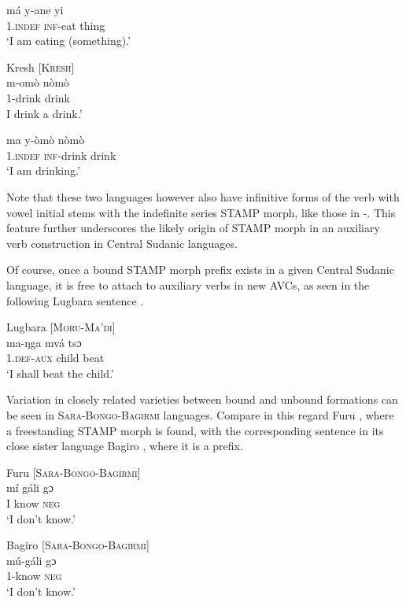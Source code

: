 \documentclass[output=paper]{langsci/langscibook}
\begin{document}
\ex \label{ex:anderson:55b}
\gll má    y-ane    yi\\
 1.\textsc{indef}  \textsc{inf}-eat    thing\\
\glt `I am eating (something).'
\z
\z

\ea\label{ex:anderson:56}
Kresh \citep[75]{TuckerBryan1966}     [\textsc{Kresh}]\\
\ea\label{ex:anderson:56a}
\gll m-omò    nòmò\\
  1-drink   drink    \\
\glt I drink a drink.'     


\ex \label{ex:anderson:56b}
\gll ma     y-òmò    nòmò\\
  \textsc{1.indef}  \textsc{inf}-drink   drink\\
\glt `I am drinking.'
\z
\z

Note that these two languages however also have infinitive forms of the verb with vowel initial stems with the indefinite series STAMP morph, like those in -. This feature further underscores the likely origin of STAMP morph in an auxiliary verb construction in Central Sudanic languages.

Of course, once a bound STAMP morph prefix exists in a given Central Sudanic language, it is free to attach to auxiliary verbs in new AVCs, as seen in the following Lugbara sentence .

\ea\label{ex:anderson:57}
Lugbara \citep[46, 47]{TuckerBryan1966}      \textsc{[Moru-Ma'di]}\\
\gll ma-ŋga  mvá  tsɔ\\
\textsc{1.def-aux}  child  beat\\
\glt `I shall beat the child.'    
\z

Variation in closely related varieties between bound and unbound formations can be seen in \textsc{Sara-Bongo-Bagirmi} languages. Compare in this regard Furu , where a freestanding STAMP morph is found, with the corresponding sentence in its close sister language Bagiro , where it is a prefix.

\ea\label{ex:anderson:58}
Furu \citep[91]{Boyeldieu1990}           [\textsc{Sara-Bongo-Bagirmi}]\\
\gll mí  gáli  gɔ          \\
I   know  \textsc{neg}      \\
\glt `I don't know.'
\z

\ea\label{ex:anderson:59}
Bagiro  \citep[91]{Boyeldieu1990}           [\textsc{Sara-Bongo-Bagirmi}]\\
\gll mú-gá{\downstep}li  gɔ\\
1-know  \textsc{neg}\\
\glt `I don't know.'  
\z
\end{document}
